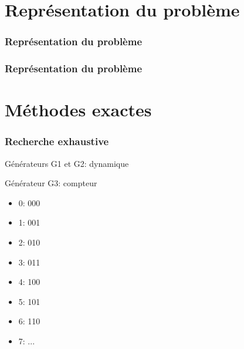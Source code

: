 \documentclass[aspectratio=169,11pt]{beamer}
\begin{document}
	\section{Représentation du problème}

	\begin{frame}
		\frametitle{Représentation du problème}
		\centering%
		\resizebox{0.8\textwidth}{!}{}%
	\end{frame}

	\begin{frame}
		\frametitle{Représentation du problème}
		\centering%
		\resizebox{\textwidth}{!}{}%
	\end{frame}

	\section{Méthodes exactes}

	\begin{frame}[t]
		\frametitle{Recherche exhaustive}
		\hfill%
		\begin{minipage}[t]{0.45\linewidth}
			\begin{block}{Générateurs G1 et G2: dynamique}
				\centering\resizebox{0.98\textwidth}{!}{}%
			\end{block}
		\end{minipage}
		\hfill%
		\begin{minipage}[t]{0.45\linewidth}
			\begin{block}{Générateur G3: compteur}
				\begin{itemize}
					\item 0: 000
					\item 1: 001
					\item 2: 010
					\item 3: 011
					\item 4: 100
					\item 5: 101
					\item 6: 110
					\item 7: ...
				\end{itemize}
			\end{block}
		\end{minipage}
		\hfill\hspace{0pt}
	\end{frame}
\end{document}
